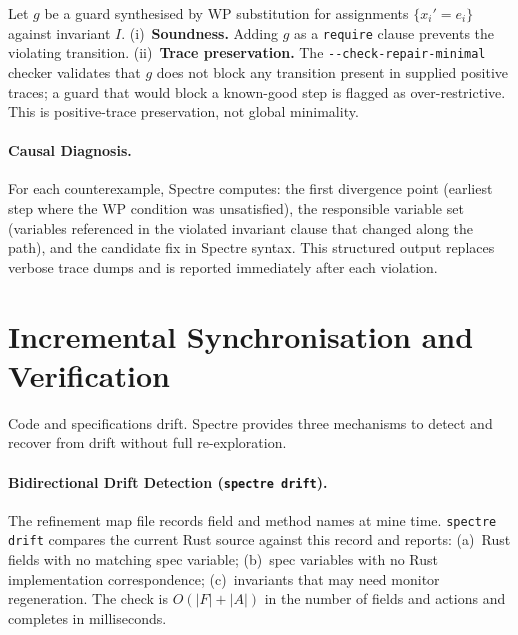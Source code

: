 \documentclass[runningheads]{llncs}
\begin{document}
\begin{corollary}\label{cor:repair}
Let $g$ be a guard synthesised by WP substitution for assignments
$\{x_i' = e_i\}$ against invariant $I$.
(i)~\textbf{Soundness.}  Adding $g$ as a \texttt{require} clause prevents the
violating transition.
(ii)~\textbf{Trace preservation.}  The \texttt{-{}-check-repair-minimal}
checker validates that $g$ does not block any transition present in supplied
positive traces; a guard that would block a known-good step is flagged as
over-restrictive.  This is positive-trace preservation, not global minimality.
\end{corollary}

\paragraph{Causal Diagnosis.}
For each counterexample, Spectre computes: the first divergence point (earliest
step where the WP condition was unsatisfied), the responsible variable set
(variables referenced in the violated invariant clause that changed along
the path), and the candidate fix in Spectre syntax.  This structured output
replaces verbose trace dumps and is reported immediately after each violation.

\section{Incremental Synchronisation and Verification}\label{sec:sync}

Code and specifications drift.
Spectre provides three mechanisms to detect and recover from drift without
full re-exploration.

\paragraph{Bidirectional Drift Detection (\texttt{spectre drift}).}
The refinement map file records field and method names at mine time.
\texttt{spectre drift} compares the current Rust source against this record
and reports: (a)~Rust fields with no matching spec variable; (b)~spec
variables with no Rust implementation correspondence; (c)~invariants
that may need monitor regeneration.  The check is $O(|F|+|A|)$ in the number
of fields and actions and completes in milliseconds.
\end{document}
